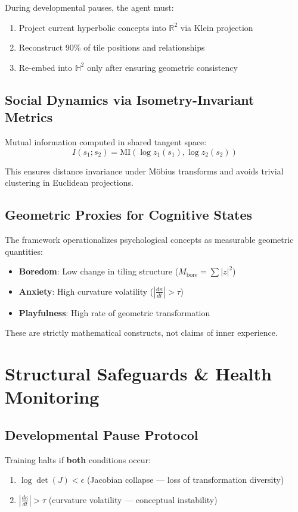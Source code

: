 \documentclass[10pt]{article}
\begin{document}
During developmental pauses, the agent must:
\begin{enumerate}
    \item Project current hyperbolic concepts into $\mathbb{R}^2$ via Klein projection
    \item Reconstruct 90\% of tile positions and relationships  
    \item Re-embed into $\mathbb{H}^2$ only after ensuring geometric consistency
\end{enumerate}

\subsection{Social Dynamics via Isometry-Invariant Metrics}

Mutual information computed in shared tangent space:
$$I(s_1; s_2) = \text{MI}(\log z_1(s_1), \log z_2(s_2))$$

This ensures distance invariance under Möbius transforms and avoids trivial clustering in Euclidean projections.

\subsection{Geometric Proxies for Cognitive States}

The framework operationalizes psychological concepts as measurable geometric quantities:
\begin{itemize}
    \item \textbf{Boredom}: Low change in tiling structure ($M_{\text{bore}} = \sum |z|^2$)
    \item \textbf{Anxiety}: High curvature volatility ($|\frac{d\kappa}{dt}| > \tau$)  
    \item \textbf{Playfulness}: High rate of geometric transformation
\end{itemize}

These are strictly mathematical constructs, not claims of inner experience.

\section{Structural Safeguards \& Health Monitoring}

\subsection{Developmental Pause Protocol}

Training halts if \textbf{both} conditions occur:
\begin{enumerate}
    \item $\log \det(J) < \epsilon$ (Jacobian collapse — loss of transformation diversity)
    \item $\left| \frac{d\kappa}{dt} \right| > \tau$ (curvature volatility — conceptual instability)
\end{enumerate}
\end{document}
